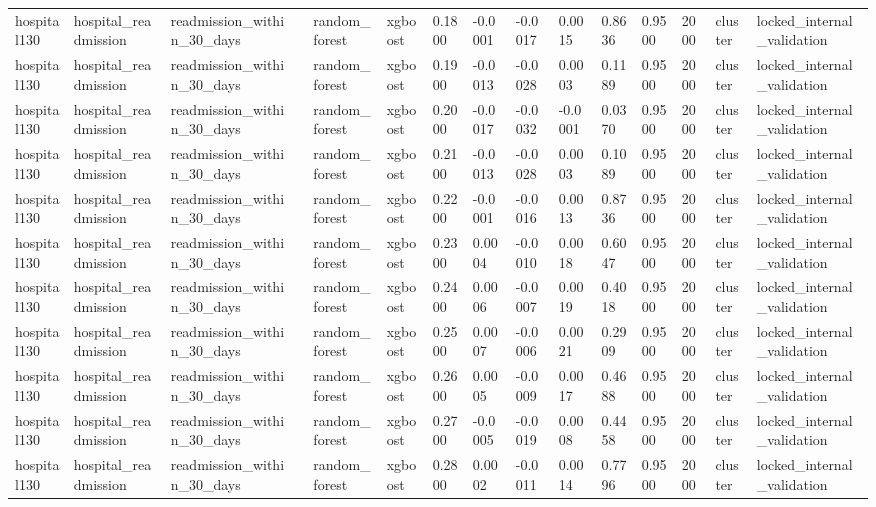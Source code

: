 \begin{tabular}{lllllllllllllll}
hospital130 & hospital\_readmission & readmission\_within\_30\_days &  & random\_forest & xgboost & 0.1800 & -0.0001 & -0.0017 & 0.0015 & 0.8636 & 0.9500 & 2000 & cluster & locked\_internal\_validation \\
hospital130 & hospital\_readmission & readmission\_within\_30\_days &  & random\_forest & xgboost & 0.1900 & -0.0013 & -0.0028 & 0.0003 & 0.1189 & 0.9500 & 2000 & cluster & locked\_internal\_validation \\
hospital130 & hospital\_readmission & readmission\_within\_30\_days &  & random\_forest & xgboost & 0.2000 & -0.0017 & -0.0032 & -0.0001 & 0.0370 & 0.9500 & 2000 & cluster & locked\_internal\_validation \\
hospital130 & hospital\_readmission & readmission\_within\_30\_days &  & random\_forest & xgboost & 0.2100 & -0.0013 & -0.0028 & 0.0003 & 0.1089 & 0.9500 & 2000 & cluster & locked\_internal\_validation \\
hospital130 & hospital\_readmission & readmission\_within\_30\_days &  & random\_forest & xgboost & 0.2200 & -0.0001 & -0.0016 & 0.0013 & 0.8736 & 0.9500 & 2000 & cluster & locked\_internal\_validation \\
hospital130 & hospital\_readmission & readmission\_within\_30\_days &  & random\_forest & xgboost & 0.2300 & 0.0004 & -0.0010 & 0.0018 & 0.6047 & 0.9500 & 2000 & cluster & locked\_internal\_validation \\
hospital130 & hospital\_readmission & readmission\_within\_30\_days &  & random\_forest & xgboost & 0.2400 & 0.0006 & -0.0007 & 0.0019 & 0.4018 & 0.9500 & 2000 & cluster & locked\_internal\_validation \\
hospital130 & hospital\_readmission & readmission\_within\_30\_days &  & random\_forest & xgboost & 0.2500 & 0.0007 & -0.0006 & 0.0021 & 0.2909 & 0.9500 & 2000 & cluster & locked\_internal\_validation \\
hospital130 & hospital\_readmission & readmission\_within\_30\_days &  & random\_forest & xgboost & 0.2600 & 0.0005 & -0.0009 & 0.0017 & 0.4688 & 0.9500 & 2000 & cluster & locked\_internal\_validation \\
hospital130 & hospital\_readmission & readmission\_within\_30\_days &  & random\_forest & xgboost & 0.2700 & -0.0005 & -0.0019 & 0.0008 & 0.4458 & 0.9500 & 2000 & cluster & locked\_internal\_validation \\
hospital130 & hospital\_readmission & readmission\_within\_30\_days &  & random\_forest & xgboost & 0.2800 & 0.0002 & -0.0011 & 0.0014 & 0.7796 & 0.9500 & 2000 & cluster & locked\_internal\_validation \\

\end{tabular}
